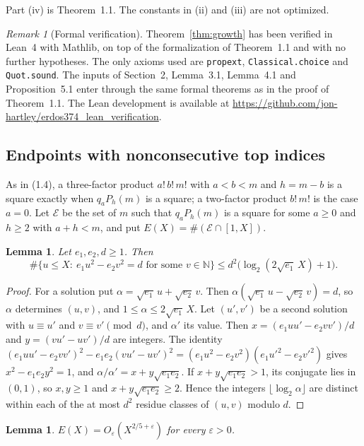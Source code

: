 \documentclass[letterpaper]{article}
\newtheorem{lemma}[theorem]{Lemma}
\theoremstyle{definition}
\theoremstyle{remark}
\newtheorem{remark}[theorem]{Remark}
\numberwithin{equation}{section}
\begin{document}
Part (iv) is Theorem~1.1. The constants in (ii) and (iii) are not optimized.

\begin{remark}[Formal verification]
Theorem~\ref{thm:growth} has been verified in Lean~4 with Mathlib, on top of the formalization of
Theorem~1.1 and with no further hypotheses. The only axioms used are \texttt{propext},
\texttt{Classical.choice} and \texttt{Quot.sound}. The inputs of Section~2, Lemma~3.1, Lemma~4.1 and
Proposition~5.1 enter through the same formal theorems as in the proof of Theorem~1.1.
The Lean development is available at
\url{https://github.com/jon-hartley/erdos374_lean_verification}.
\end{remark}

\subsection{Endpoints with nonconsecutive top indices}

As in (1.4), a three-factor product $a!\,b!\,m!$ with $a<b<m$ and $h=m-b$ is a square exactly when
$q_aP_h(m)$ is a square; a two-factor product $b!\,m!$ is the case $a=0$. Let $\mathcal E$ be the set of
$m$ such that $q_aP_h(m)$ is a square for some $a\ge 0$ and $h\ge 2$ with $a+h<m$, and put
$E(X)=\#(\mathcal E\cap[1,X])$.

\begin{lemma}\label{lem:pellcount}
Let $e_1,e_2,d\ge 1$. Then
\[
  \#\bigl\{u\le X:\ e_1u^2-e_2v^2=d \text{ for some } v\in\mathbb N\bigr\}
  \le d^2\bigl(\log_2(2\sqrt{e_1}\,X)+1\bigr).
\]
\end{lemma}

\begin{proof}
For a solution put $\alpha=\sqrt{e_1}\,u+\sqrt{e_2}\,v$. Then $\alpha(\sqrt{e_1}\,u-\sqrt{e_2}\,v)=d$,
so $\alpha$ determines $(u,v)$, and $1\le\alpha\le 2\sqrt{e_1}\,X$. Let $(u',v')$ be a second solution
with $u\equiv u'$ and $v\equiv v'\pmod d$, and $\alpha'$ its value. Then
$x=(e_1uu'-e_2vv')/d$ and $y=(vu'-uv')/d$ are integers. The identity
$(e_1uu'-e_2vv')^2-e_1e_2(vu'-uv')^2=(e_1u^2-e_2v^2)(e_1u'^2-e_2v'^2)$ gives $x^2-e_1e_2y^2=1$, and
$\alpha/\alpha'=x+y\sqrt{e_1e_2}$. If $x+y\sqrt{e_1e_2}>1$, its conjugate lies in $(0,1)$, so
$x,y\ge 1$ and $x+y\sqrt{e_1e_2}\ge 2$. Hence the integers $\lfloor\log_2\alpha\rfloor$ are distinct
within each of the at most $d^2$ residue classes of $(u,v)$ modulo $d$.
\end{proof}

\begin{lemma}\label{lem:E}
$E(X)=O_\varepsilon(X^{2/5+\varepsilon})$ for every $\varepsilon>0$.
\end{lemma}
\end{document}
